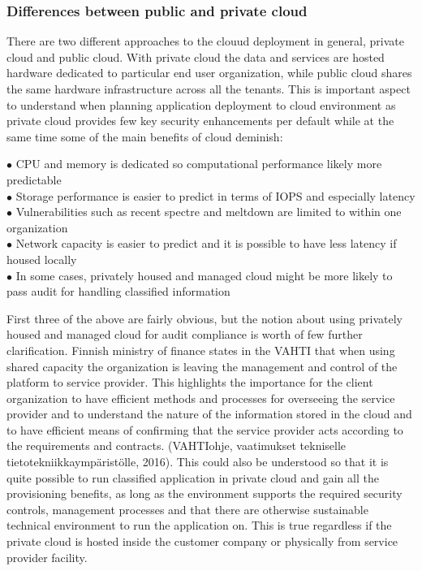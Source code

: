 \documentclass{article}
\begin{document}
\subsubsection{Differences between public and private cloud}
There are two different approaches to the clouud deployment in general, private cloud and public cloud. With private cloud the data and services are hosted hardware dedicated to particular end user organization, while public cloud shares the same hardware infrastructure across all the tenants. This is important aspect to understand when planning application deployment to cloud environment as private cloud provides few key security enhancements per default while at the same time some of the main benefits of cloud deminish:
\begin{description}
	\item[$\bullet$ CPU and memory is dedicated so computational performance likely more predictable]
	\item[$\bullet$ Storage performance is easier to predict in terms of IOPS and especially latency]
	\item[$\bullet$ Vulnerabilities such as recent spectre and meltdown are limited to within one organization]
	\item[$\bullet$ Network capacity is easier to predict and it is possible to have less latency if housed locally]
	\item[$\bullet$ In some cases, privately housed and managed cloud might be more likely to pass audit for handling classified information]
\end{description}
First three of the above are fairly obvious, but the notion about using privately housed and managed cloud for audit compliance is worth of few further clarification. Finnish ministry of finance states in the VAHTI that when using shared capacity the organization is leaving the management and control of the platform to service provider. This highlights the  importance for the client organization to have efficient methods and processes for overseeing the service provider and to understand the nature of the information stored in the cloud and to have efficient means of confirming that the service provider acts according to the requirements and contracts. (VAHTIohje, vaatimukset tekniselle tietotekniikkaympäristölle, 2016). This could also be understood so that it is quite possible to run classified application in private cloud and gain all the provisioning benefits, as long as the environment supports the required security controls, management processes and that there are otherwise sustainable technical environment to run the application on. This is true regardless if the private cloud is hosted inside the customer company or physically from service provider facility.
\end{document}
